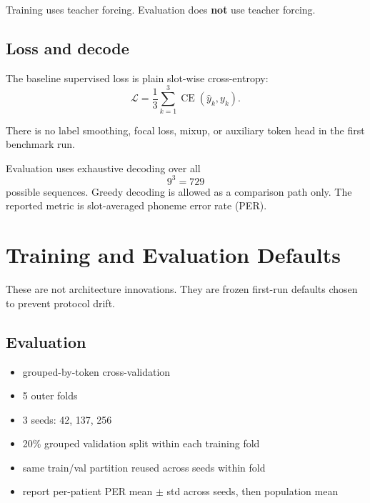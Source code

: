 \documentclass[11pt,letterpaper]{article}
\begin{document}
Training uses teacher forcing. Evaluation does \textbf{not} use teacher forcing.

\subsection{Loss and decode}

The baseline supervised loss is plain slot-wise cross-entropy:
\begin{equation}
\mathcal{L}
=
\frac{1}{3}\sum_{k=1}^{3} \operatorname{CE}(\hat{y}_k, y_k).
\end{equation}

There is no label smoothing, focal loss, mixup, or auxiliary token head in the first benchmark run.

Evaluation uses exhaustive decoding over all
\begin{equation}
9^3 = 729
\end{equation}
possible sequences. Greedy decoding is allowed as a comparison path only. The reported metric is slot-averaged phoneme error rate (PER).


\section{Training and Evaluation Defaults}

These are not architecture innovations. They are frozen first-run defaults chosen to prevent protocol drift.

\subsection{Evaluation}

\begin{itemize}[leftmargin=2em, itemsep=0.2em]
\item grouped-by-token cross-validation
\item 5 outer folds
\item 3 seeds: 42, 137, 256
\item 20\% grouped validation split within each training fold
\item same train/val partition reused across seeds within fold
\item report per-patient PER mean $\pm$ std across seeds, then population mean
\end{itemize}
\end{document}
